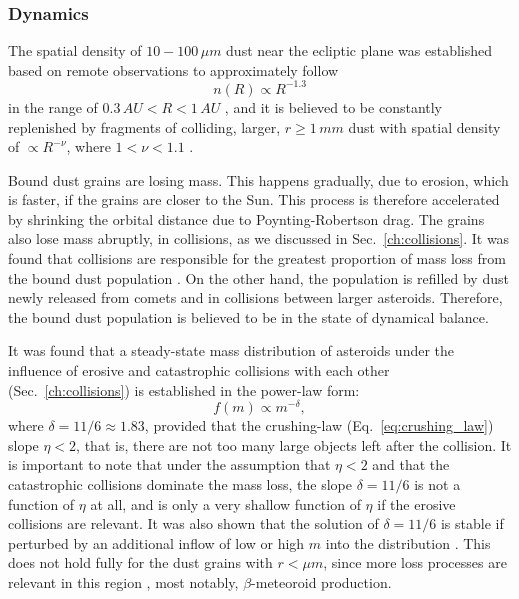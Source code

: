 \subsubsection{Dynamics}

The spatial density of $10 - 100 \, \si{\mu m}$ dust near the ecliptic plane was established based on remote observations to approximately follow 
\begin{equation}
    n(R) \propto R^{-1.3} \label{eq:dust_number_density}
\end{equation}
in the range of $0.3 \, \si{AU} < R < 1 \, \si{AU}$ \citep{leinert1981zodiacal}, and it is believed to be constantly replenished by fragments of colliding, larger, $r \geq 1 \, \si{mm}$ dust with spatial density of $\propto R^{-\nu}$, where $1 < \nu < 1.1$ \citep{leinert1983maintain}.

Bound dust grains are losing mass. This happens gradually, due to erosion, which is faster, if the grains are closer to the Sun. This process is therefore accelerated by shrinking the orbital distance due to Poynting-Robertson drag. The grains also lose mass abruptly, in collisions, as we discussed in Sec.~\ref{ch:collisions}. It was found that collisions are responsible for the greatest proportion of mass loss from the bound dust population \citep{grun1985collisional}. On the other hand, the population is refilled by dust newly released from comets and in collisions between larger asteroids. Therefore, the bound dust population is believed to be in the state of dynamical balance. 

It was found \citep{dohnanyi1969collisional} that a steady-state mass distribution of asteroids under the influence of erosive and catastrophic collisions with each other (Sec.~\ref{ch:collisions}) is established in the power-law form:
\begin{equation}
    f(m) \propto m^{-\delta}, \label{eq:mass_distribution}
\end{equation}
where $\delta = 11/6 \approx 1.83$, provided that the crushing-law (Eq.~\ref{eq:crushing_law}) slope $\eta < 2$, that is, there are not too many large objects left after the collision. It is important to note that under the assumption that $\eta < 2$ and that the catastrophic collisions dominate the mass loss, the slope $\delta = 11/6$ is not a function of $\eta$ at all, and is only a very shallow function of $\eta$ if the erosive collisions are relevant. It was also shown that the solution of $\delta = 11/6$ is stable if perturbed by an additional inflow of low or high $m$ into the distribution \citep{dohnanyi1969collisional}. This does not hold fully for the dust grains with $r < \si{\mu m}$, since more loss processes are relevant in this region \citep{grun1985collisional}, most notably, $\beta$-meteoroid production.

